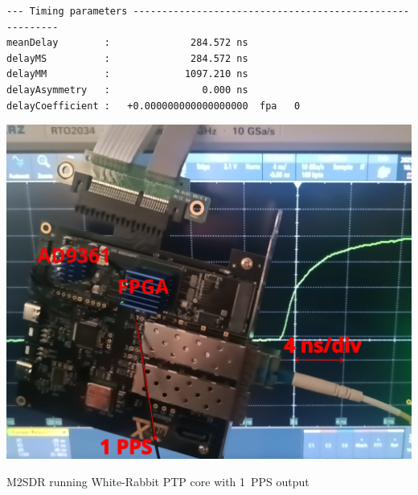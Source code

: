 \documentclass[compress,10pt,aspectratio=169]{beamer}
\begin{document}
\begin{frame}[fragile]
\begin{minipage}[t]{1.05\linewidth}
\begin{minipage}{.66\linewidth}
{\begin{Verbatim}[commandchars=\\\{\}]
--- Timing parameters ---------------------------------------------------------
meanDelay        :              284.572 ns
delayMS          :              284.572 ns 
delayMM          :             1097.210 ns 
delayAsymmetry   :                0.000 ns
delayCoefficient :   +0.000000000000000000  fpa   0
\end{Verbatim}
}
\end{minipage}
\begin{minipage}{.33\linewidth}
\includegraphics[width=1.06\linewidth]{figures/2025-06-16-203322_2704x1050_scrot.png}

{\footnotesize M2SDR running White-Rabbit PTP core with 1~PPS output\par}
\end{minipage}
\end{minipage}
\end{frame}
\end{document}
